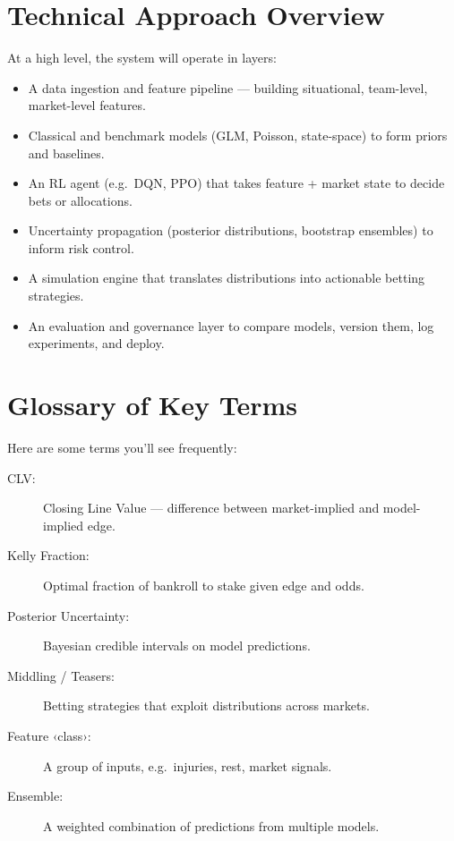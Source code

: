 \section{Technical Approach Overview}

At a high level, the system will operate in layers:

\begin{itemize}
  \item A data ingestion and feature pipeline — building situational, team-level, market-level features.
  \item Classical and benchmark models (GLM, Poisson, state-space) to form priors and baselines.
  \item An RL agent (e.g.\ DQN, PPO) that takes feature + market state to decide bets or allocations.
  \item Uncertainty propagation (posterior distributions, bootstrap ensembles) to inform risk control.
  \item A simulation engine that translates distributions into actionable betting strategies.
  \item An evaluation and governance layer to compare models, version them, log experiments, and deploy.
\end{itemize}



\section{Glossary of Key Terms}

Here are some terms you’ll see frequently:
\begin{description}
  \item[CLV:] Closing Line Value — difference between market-implied and model-implied edge.
  \item[Kelly Fraction:] Optimal fraction of bankroll to stake given edge and odds.
  \item[Posterior Uncertainty:] Bayesian credible intervals on model predictions.
  \item[Middling / Teasers:] Betting strategies that exploit distributions across markets.
  \item[Feature ‹class›:] A group of inputs, e.g.\ injuries, rest, market signals.
  \item[Ensemble:] A weighted combination of predictions from multiple models.
\end{description}

